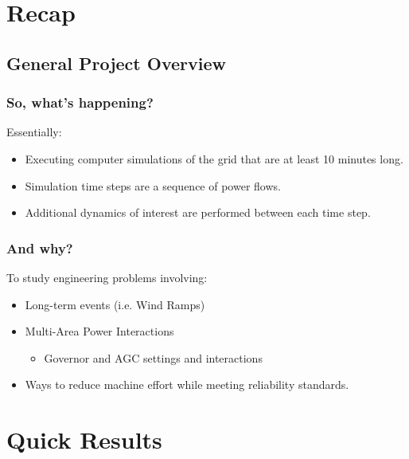 \documentclass[14pt, unknownkeysallowed]{beamer}
\begin{document}
\section{Recap}
\subsection{General Project Overview}
\begin{frame}
\frametitle{So, what's happening?}
Essentially:
\begin{itemize}
	\item Executing computer simulations of the grid that are  at least 10 minutes long.
	\item Simulation time steps are a sequence of power flows.
	\item Additional dynamics of interest are performed between each time step.
\end{itemize}

\end{frame}
\begin{frame}
\frametitle{And why?}
To study engineering problems involving:
\begin{itemize}
	\item Long-term events (i.e. Wind Ramps)
	\item Multi-Area Power Interactions
	\begin{itemize}
		\item Governor and AGC settings	and interactions
	\end{itemize}
	\item Ways to reduce machine effort while meeting reliability standards.
\end{itemize}
\end{frame}
\section{Quick Results}
\end{document}
